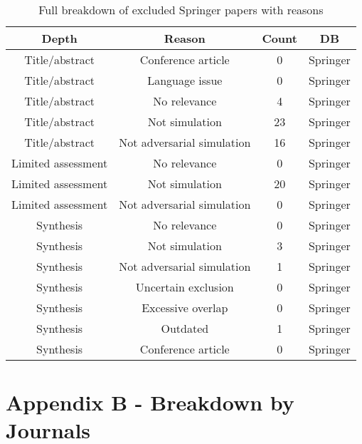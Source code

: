 \documentclass{article}
\begin{document}
\begin{center}
\begin{table}[h!]
\begin{tabular}{ | c | c | c | c |}
\hline
Depth & Reason & Count & DB \\
\hline
Title/abstract & Conference article & 0 & Springer \\
\hline
Title/abstract & Language issue & 0 & Springer \\
\hline
Title/abstract & No relevance & 4 & Springer \\
\hline
Title/abstract & Not simulation & 23 & Springer \\
\hline
Title/abstract & Not adversarial simulation & 16 & Springer \\
\hline
Limited assessment & No relevance & 0 & Springer \\
\hline
Limited assessment & Not simulation & 20 & Springer \\
\hline
Limited assessment & Not adversarial simulation & 0 & Springer \\
\hline
Synthesis & No relevance & 0 & Springer \\
\hline
Synthesis & Not simulation & 3 & Springer \\
\hline
Synthesis & Not adversarial simulation & 1 & Springer \\
\hline
Synthesis & Uncertain exclusion & 0 & Springer \\
\hline
Synthesis & Excessive overlap & 0 & Springer \\
\hline
Synthesis & Outdated & 1 & Springer \\
\hline
Synthesis & Conference article & 0 & Springer \\
\hline
\end{tabular}
\caption{\label{table:RelevanceBreakdownSpringer} Full breakdown of excluded Springer papers with reasons}
\end{table}
\end{center}


\newpage
\section{Appendix B - Breakdown by Journals}
\end{document}
